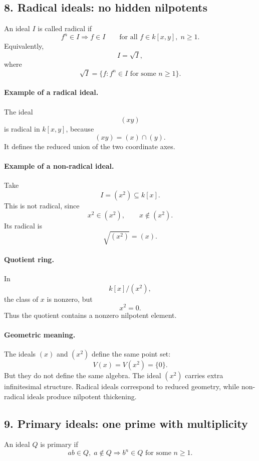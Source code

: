 \documentclass[12pt,a4paper]{article}
\theoremstyle{plain}
\theoremstyle{definition}      %
\begin{document}
	\subsection*{8. Radical ideals: no hidden nilpotents}
	
	An ideal \(I\) is called radical if
	\[
	f^n\in I \Longrightarrow f\in I
	\qquad \text{for all } f \in k[x,y],\; n\geq 1.
	\]
	Equivalently,
	\[
	I=\sqrt{I},
	\]
	where
	\[
	\sqrt{I}=\{f: f^n\in I \text{ for some } n\ge 1\}.
	\]
	
	\paragraph{Example of a radical ideal.}
	The ideal
	\[
	(xy)
	\]
	is radical in \(k[x,y]\), because
	\[
	(xy)=(x)\cap (y).
	\]
	It defines the reduced union of the two coordinate axes.
	
	\paragraph{Example of a non-radical ideal.}
	Take
	\[
	I=(x^2)\subseteq k[x].
	\]
	This is not radical, since
	\[
	x^2\in (x^2), \qquad x\notin (x^2).
	\]
	Its radical is
	\[
	\sqrt{(x^2)}=(x).
	\]
	
	\paragraph{Quotient ring.}
	In
	\[
	k[x]/(x^2),
	\]
	the class of \(x\) is nonzero, but
	\[
	x^2=0.
	\]
	Thus the quotient contains a nonzero nilpotent element.
	
	\paragraph{Geometric meaning.}
	The ideals \((x)\) and \((x^2)\) define the same point set:
	\[
	V(x)=V(x^2)=\{0\}.
	\]
	But they do not define the same algebra. The ideal \((x^2)\) carries extra infinitesimal structure. Radical ideals correspond to reduced geometry, while non-radical ideals produce nilpotent thickening.
	
	\subsection*{9. Primary ideals: one prime with multiplicity}
	
	An ideal \(Q\) is primary if
	\[
	ab\in Q,\; a\notin Q \Longrightarrow b^n\in Q \text{ for some } n\ge 1.
	\]
	
\end{document}
